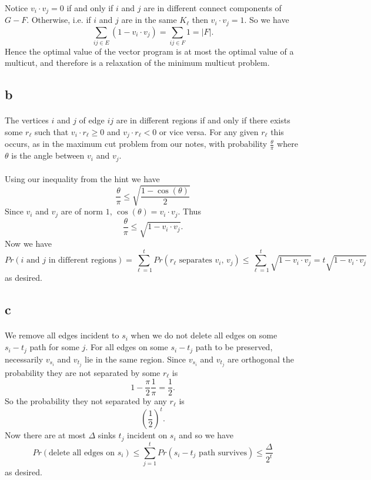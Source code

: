 \documentclass[letterpaper,12pt,oneside,onecolumn]{article}
\begin{document}
\paragraph{}
Notice $v_i\cdot v_j = 0$ if and only if $i$ and $j$ are in different connect components of $G-F$. Otherwise, i.e. if $i$ and $j$ are in the same $K_\ell$ then $v_i\cdot v_j = 1$. So we have
$$\sum_{ij\in E} (1-v_i\cdot v_j) = \sum_{ij \in F} 1 = |F|.$$
Hence the optimal value of the vector program is at most the optimal value of a multicut, and therefore is a relaxation of the minimum multicut problem.
\subsection{b}
\paragraph{}
The vertices $i$ and $j$ of edge $ij$ are in different regions if and only if there exists some $r_\ell$ such that $v_i\cdot r_\ell  \geq 0$ and $ v_j \cdot r_\ell < 0$ or vice versa. For any given $r_\ell$ this occurs, as in the maximum cut problem from our notes, with probability $\frac{\theta}{\pi}$ where $\theta$ is the angle between $v_i$ and $v_j$.
\paragraph{}
Using our inequality from the hint we have
$$\frac{\theta}{\pi} \leq \sqrt{\frac{1-\cos(\theta)}{2}}$$
Since $v_i$ and $v_j$ are of norm $1$, $\cos(\theta) = v_i\cdot v_j$. Thus
$$\frac{\theta}{\pi} \leq \sqrt{1-v_i\cdot v_j}.$$
Now we have
$$Pr(\text{$i$ and $j$ in different regions}) = \sum_{\ell = 1}^t Pr(\text{$r_\ell$ separates $v_i$, $v_j$}) \leq \sum_{\ell = 1}^t \sqrt{1-v_i\cdot v_j} = t\sqrt{1-v_i\cdot v_j}$$
as desired.
\subsection{c}
\paragraph{}
We remove all edges incident to $s_i$ when we do not delete all edges on some $s_i-t_j$ path for some $j$. For all edges on some $s_i-t_j$ path to be preserved, necessarily $v_{s_i}$ and $v_{t_j}$ lie in the same region. Since $v_{s_i}$ and $v_{t_j}$ are orthogonal the probability they are not separated by some $r_\ell$ is 
$$1- \frac{\pi}{2}\frac{1}{\pi} = \frac{1}{2}.$$
So the probability they not separated by any $r_\ell$ is
$$(\frac{1}{2})^t.$$
Now there are at most $\Delta$ sinks $t_j$ incident on $s_i$ and so we have
$$Pr(\text{delete all edges on $s_i$}) \leq \sum_{j=1}^tPr(\text{$s_i-t_j$ path survives}) \leq \frac{\Delta}{2^t}$$
as desired.
\end{document}
